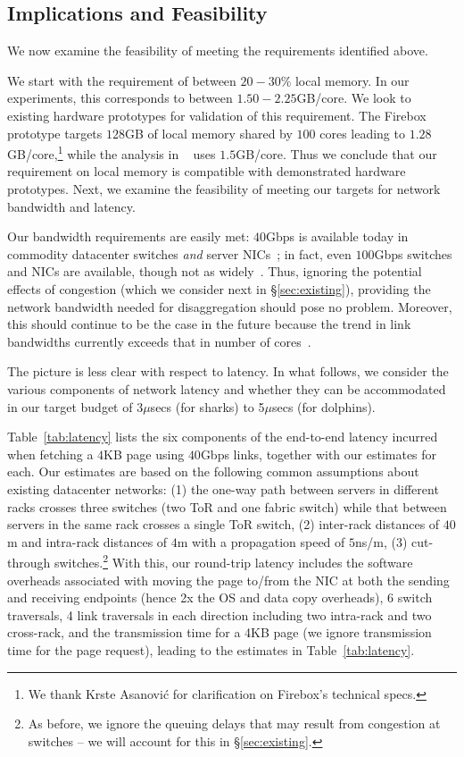 \subsection{Implications and Feasibility}
\label{ssec:rtt}
We now examine the feasibility of meeting the requirements identified above. 

 We start with the requirement of between $20-30$\% local memory. In our experiments, this corresponds to between $1.50-2.25$GB/core. We look to existing hardware prototypes for validation of this requirement. The Firebox prototype targets $128$GB of local memory shared by $100$ cores leading to $1.28$GB/core,\footnote{We thank Krste Asanovi{\'c} for clarification on Firebox's technical specs.} while the analysis in ~\cite{ddcHwDesign1} uses $1.5$GB/core. Thus we conclude that our requirement on local memory is compatible with demonstrated hardware prototypes.
Next, we examine the feasibility of meeting our targets for network bandwidth and latency.


 Our bandwidth requirements are easily met: $40$Gbps is available today in commodity datacenter switches \emph{and} server NICs~\cite{40gnic}; in fact, even $100$Gbps switches and NICs are available, though not as widely~\cite{100gnic}.
Thus, ignoring the potential effects of congestion (which we consider next in \S\ref{sec:existing}), providing the network bandwidth needed for disaggregation should pose no problem. Moreover, this should continue to be the case in the future because the trend in link bandwidths currently exceeds that in number of cores~\cite{hmc1, hmc2, hmc3}.


 The picture is less clear with respect to latency. In what follows, we consider the various components of network latency and whether they can be accommodated in our target budget of 3$\mu$secs (for sharks) to 5$\mu$secs (for dolphins).

Table~\ref{tab:latency} lists the six components of the end-to-end latency incurred when fetching  a $4$KB page using $40$Gbps links, together with our estimates for each. Our estimates are based on the following common assumptions about existing datacenter networks: (1) the one-way path between servers in different racks crosses three switches (two ToR and one fabric switch) while that between servers in the same rack crosses a single ToR switch, (2) inter-rack distances of $40$m and intra-rack distances of $4$m with a propagation speed of $5$ns/m, (3) cut-through switches.\footnote{As before, we ignore the queuing delays that may result from congestion at switches -- we will account for this in \S\ref{sec:existing}.}  
With this, our round-trip latency includes the software overheads associated with moving the page to/from the NIC at both the sending and receiving endpoints (hence 2x the OS and data copy overheads), 6 switch traversals, 4 link traversals in each direction including two intra-rack and two cross-rack, and the transmission time for a 4KB page (we ignore transmission time for the page request), leading to the estimates in Table~\ref{tab:latency}. 


